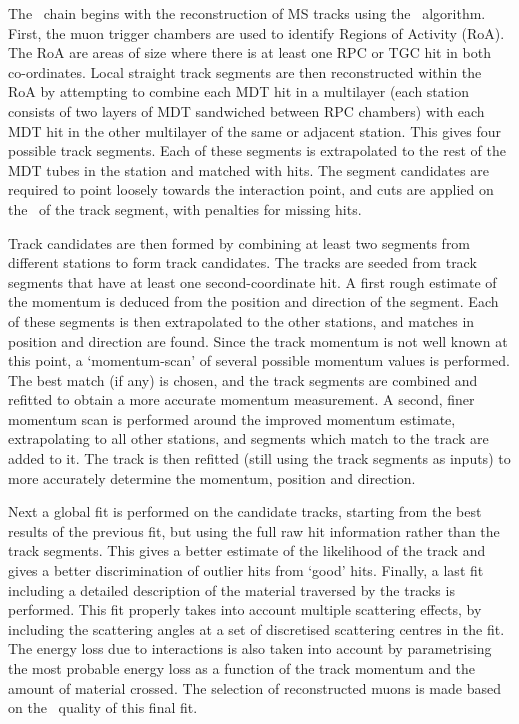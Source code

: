 The \staco\ chain begins with the reconstruction of MS tracks using the \muonboy\
algorithm. First, the muon trigger chambers are used to identify Regions of
Activity (RoA). The RoA are areas of size \deltaetadeltaphi{0.4}{0.4} where
there is at least one RPC or TGC hit in both co-ordinates. Local straight track
segments are then reconstructed within the RoA by attempting to combine each MDT
hit in a multilayer (each station consists of two layers of MDT sandwiched
between RPC chambers) with each MDT hit in the other multilayer of the same or
adjacent station. This gives four possible track segments. Each of these segments
is extrapolated to the rest of the MDT tubes in the station and matched with hits. 
The segment candidates are required to point loosely towards the
interaction point, and cuts are applied on the \chisquared\ of the track
segment, with penalties for missing hits. 

Track candidates are then formed by combining at least two segments from
different stations to form track candidates. The tracks are seeded from track
segments that have at least one second-coordinate hit. A first rough estimate of
the momentum is deduced from the position and direction of the segment. Each of
these segments is then extrapolated to the other stations, and matches in
position and direction are found. Since the track momentum is not well known at
this point, a `momentum-scan' of several possible momentum values is performed.
The best match (if any) is chosen, and the track segments are combined and
refitted to obtain a more accurate momentum measurement. A second, finer
momentum scan is performed around the improved momentum estimate, extrapolating
to all other stations, and segments which match to the track are added to it.
The track is then refitted (still using the track segments as inputs) to more
accurately determine the momentum, position and direction. 

Next a global fit is performed on the candidate tracks, starting from the best
results of the previous fit, but using the full raw hit information rather than
the track segments. This gives a better estimate of the likelihood of the track
and gives a better discrimination of outlier hits from `good' hits. Finally, a
last fit including a detailed description of the material traversed by the
tracks is performed.  This fit properly takes into account multiple scattering
effects, by including the scattering angles at a set of discretised scattering
centres in the fit. The energy loss due to interactions is also taken into
account  by parametrising the most probable energy loss as a function of the
track momentum and the amount of material crossed. The selection of
reconstructed muons is made based on the \chisquared\ quality of this final fit.

